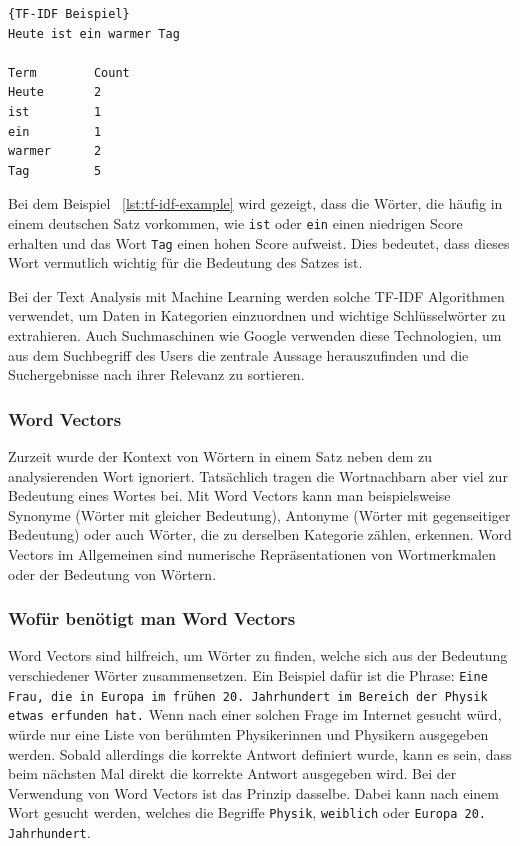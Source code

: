 \begin{lstlisting}[label={lst:tf-idf-example},caption={TF-IDF Beispiel}]{TF-IDF Beispiel}
Heute ist ein warmer Tag

Term        Count
Heute       2
ist         1
ein         1
warmer      2
Tag         5
\end{lstlisting}

Bei dem Beispiel ~\ref{lst:tf-idf-example} wird gezeigt, dass die Wörter, die häufig in einem deutschen Satz vorkommen, wie \texttt{ist} oder \texttt{ein} einen niedrigen Score erhalten und das Wort \texttt{Tag} einen hohen Score aufweist.
Dies bedeutet, dass dieses Wort vermutlich wichtig für die Bedeutung des Satzes ist.

Bei der Text Analysis mit Machine Learning werden solche TF-IDF Algorithmen verwendet, um Daten in Kategorien einzuordnen und wichtige Schlüsselwörter zu extrahieren.
Auch Suchmaschinen wie Google verwenden diese Technologien, um aus dem Suchbegriff des Users die zentrale Aussage herauszufinden und die Suchergebnisse nach ihrer Relevanz zu sortieren.\cite{tfIdf}

\subsubsection{Word Vectors}

Zurzeit wurde der Kontext von Wörtern in einem Satz neben dem zu analysierenden Wort ignoriert.
Tatsächlich tragen die Wortnachbarn aber viel zur Bedeutung eines Wortes bei.
Mit Word Vectors kann man beispielsweise Synonyme (Wörter mit gleicher Bedeutung), Antonyme (Wörter mit gegenseitiger Bedeutung) oder auch Wörter, die zu derselben Kategorie zählen, erkennen.
Word Vectors im Allgemeinen sind numerische Repräsentationen von Wortmerkmalen oder der Bedeutung von Wörtern.

\subsubsection{Wofür benötigt man Word Vectors}

Word Vectors sind hilfreich, um Wörter zu finden, welche sich aus der Bedeutung verschiedener Wörter zusammensetzen.
Ein Beispiel dafür ist die Phrase: \texttt{Eine Frau, die in Europa im frühen 20. Jahrhundert im Bereich der Physik etwas erfunden hat.}
Wenn nach einer solchen Frage im Internet gesucht würd, würde nur eine Liste von berühmten Physikerinnen und Physikern ausgegeben werden.
Sobald allerdings die korrekte Antwort definiert wurde, kann es sein, dass beim nächsten Mal direkt die korrekte Antwort ausgegeben wird.
Bei der Verwendung von Word Vectors ist das Prinzip dasselbe.
Dabei kann nach einem Wort gesucht werden, welches die Begriffe \texttt{Physik}, \texttt{weiblich} oder \texttt{Europa 20. Jahrhundert}.\cite{nlpInAction}

